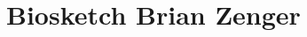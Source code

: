 \documentclass[11pt]{report}
\begin{document}
\thispagestyle{empty}  %

\newpage

\tableofcontents
\newpage

%
%
%


% 


\newpage

%

%

\section{Biosketch Brian Zenger}

\newpage

% 
%

\end{document}
